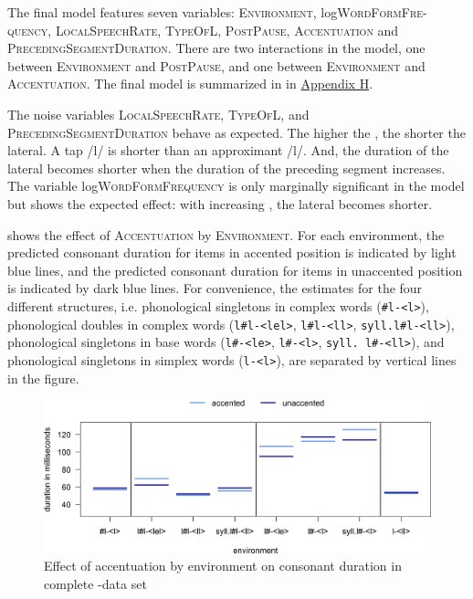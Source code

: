The final model features seven variables: \textsc{Environment}, log\textsc{WordFormFre-quency},  \textsc{LocalSpeechRate}, \textsc{TypeOfL}, \textsc{PostPause}, \textsc{Accentuation} and \textsc{PrecedingSegmentDuration}. 
There are two interactions in the model, one between \textsc{Environment} and \textsc{PostPause}, and one between \textsc{Environment} and \textsc{Accentuation}. The final model is summarized in  in \hyperref[Appendix H: Model Summaries Experiment]{Appendix H}.


The noise variables \textsc{LocalSpeechRate}, \textsc{TypeOfL}, and \textsc{PrecedingSegmentDuration} behave as expected. The higher the , the shorter the lateral. A tap /l/ is shorter than an approximant /l/. And, the duration of the lateral becomes shorter when the duration of the preceding segment increases.
The variable log\textsc{WordFormFrequency} is only marginally significant in the model but shows the expected effect: with increasing , the lateral becomes shorter. 


 shows the effect of \textsc{Accentuation} by \textsc{Environment}. For each environment, the predicted consonant duration for items in accented position is indicated by light blue lines, and the predicted consonant duration for  items in unaccented position is indicated by dark blue lines.
 For convenience, the estimates for the four different structures, i.e. phonological singletons in complex words (\texttt{\#l-<l>}), phonological doubles in complex words  (\texttt{l\#l-<lel>}, \texttt{l\#l-<ll>}, \texttt{syll.l\#l-<ll>}), phonological singletons in base words (\texttt{l\#-<le>}, \texttt{l\#-<l>}, \texttt{syll. l\#-<ll>}), and phonological singletons in simplex words (\texttt{l-<l>}), are separated by vertical lines in the figure. 


\begin{figure}
	

	\includegraphics [scale=0.48] {images/Experiment/LyModelCompleteInterEnvAccLines}

	\caption{Effect of accentuation by environment on consonant duration in complete -data set}
	\label{fig:Env Acc ly Complete experiment}

\end{figure}




